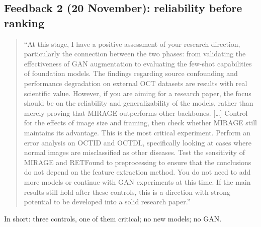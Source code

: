 \documentclass[10pt,a4paper]{article}
\newenvironment{parts}{\begin{description}[style=unboxed, leftmargin=0pt, itemsep=3pt, font=\normalfont\bfseries\itshape]}{\end{description}}
\newenvironment{topic}[2]{\subsection{#1}\label{#2}\begin{parts}}{\end{parts}}
\begin{document}
\begin{topic}{Feedback 2 (20 November): reliability before ranking}{sec:fb2}
\item[The problem (your words, 20 November).] \mbox{}
\begin{quote}\small
``At this stage, I have a positive assessment of your research direction, particularly the connection between
the two phases: from validating the effectiveness of GAN augmentation to evaluating the few-shot capabilities
of foundation models. The findings regarding source confounding and performance degradation on external OCT
datasets are results with real scientific value. However, if you are aiming for a research paper, the focus
should be on the reliability and generalizability of the models, rather than merely proving that MIRAGE
outperforms other backbones. [\ldots] Control for the effects of image size and framing, then check whether
MIRAGE still maintains its advantage. This is the most critical experiment. Perform an error analysis on OCTID
and OCTDL, specifically looking at cases where normal images are misclassified as other diseases. Test the
sensitivity of MIRAGE and RETFound to preprocessing to ensure that the conclusions do not depend on the
feature extraction method. You do not need to add more models or continue with GAN experiments at this time.
If the main results still hold after these controls, this is a direction with strong potential to be
developed into a solid research paper.''
\end{quote}
In short: three controls, one of them critical; no new models; no GAN.


\end{topic}
\end{document}
